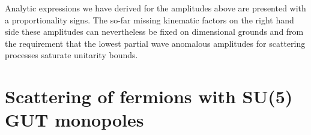 \documentclass[a4paper,11pt]{article}
\begin{document}
\medskip

Analytic expressions we have derived for the amplitudes above are presented with a proportionality signs. The so-far missing kinematic factors on the right hand side these amplitudes can nevertheless be fixed on dimensional grounds and from the requirement that the lowest partial wave anomalous amplitudes for scattering processes saturate unitarity bounds. 





\section{Scattering of fermions with SU(5) GUT monopoles}
\label{Sec:su5}
\end{document}
